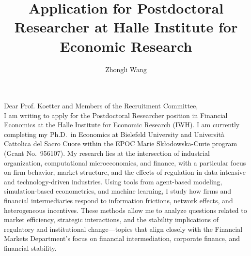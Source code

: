 \documentclass{nfr}
\title{Application for Postdoctoral Researcher at Halle Institute for Economic Research}
\author{Zhongli Wang}
\begin{document}

% 
% 
% 
% 


\maketitle


\noindent Dear Prof. Koetter and Members of the Recruitment Committee,\\[0.2cm]

I am writing to apply for the Postdoctoral Researcher position in Financial Economics at the Halle Institute for Economic Research (IWH). 
I am currently completing my Ph.D.\ in Economics at Bielefeld University and Università Cattolica del Sacro Cuore within the EPOC Marie Skłodowska-Curie program (Grant No.~956107). 
My research lies at the intersection of industrial organization, computational microeconomics, and finance, with a particular focus on firm behavior, market structure, and the effects of regulation in data-intensive and technology-driven industries. 
Using tools from agent-based modeling, simulation-based econometrics, and machine learning, I study how firms and financial intermediaries respond to information frictions, network effects, and heterogeneous incentives. 
These methods allow me to analyze questions related to market efficiency, strategic interactions, and the stability implications of regulatory and institutional change—topics that align closely with the Financial Markets Department’s focus on financial intermediation, corporate finance, and financial stability.\\
\end{document}
